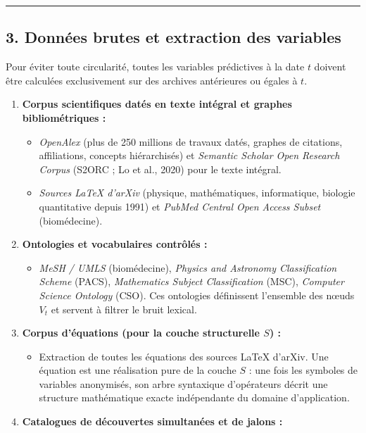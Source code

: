 \documentclass[a4paper,11pt]{article}
\providecommand{\tightlist}{\setlength{\itemsep}{0pt}\setlength{\parskip}{0pt}}
\begin{document}
\begin{center}\rule{0.5\linewidth}{0.5pt}\end{center}

\subsection*{3. Données brutes et extraction des variables}

Pour éviter toute circularité, toutes les variables prédictives à la
date \(t\) doivent être calculées exclusivement sur des archives
antérieures ou égales à \(t\).

\begin{enumerate}
\def\labelenumi{\arabic{enumi}.}
\tightlist
\item
  \textbf{Corpus scientifiques datés en texte intégral et graphes
  bibliométriques :}

  \begin{itemize}
  \tightlist
  \item
    \emph{OpenAlex} (plus de 250 millions de travaux datés, graphes de
    citations, affiliations, concepts hiérarchisés) et \emph{Semantic
    Scholar Open Research Corpus} (S2ORC ; Lo et al., 2020) pour le
    texte intégral.
  \item
    \emph{Sources LaTeX d'arXiv} (physique, mathématiques, informatique,
    biologie quantitative depuis 1991) et \emph{PubMed Central Open
    Access Subset} (biomédecine).
  \end{itemize}
\item
  \textbf{Ontologies et vocabulaires contrôlés :}

  \begin{itemize}
  \tightlist
  \item
    \emph{MeSH / UMLS} (biomédecine), \emph{Physics and Astronomy
    Classification Scheme} (PACS), \emph{Mathematics Subject
    Classification} (MSC), \emph{Computer Science Ontology} (CSO). Ces
    ontologies définissent l'ensemble des nœuds \(V_t\) et servent à
    filtrer le bruit lexical.
  \end{itemize}
\item
  \textbf{Corpus d'équations (pour la couche structurelle \(S\)) :}

  \begin{itemize}
  \tightlist
  \item
    Extraction de toutes les équations des sources LaTeX d'arXiv. Une
    équation est une réalisation pure de la couche \(S\) : une fois les
    symboles de variables anonymisés, son arbre syntaxique d'opérateurs
    décrit une structure mathématique exacte indépendante du domaine
    d'application.
  \end{itemize}
\item
  \textbf{Catalogues de découvertes simultanées et de jalons :}


\end{enumerate}
\end{document}
